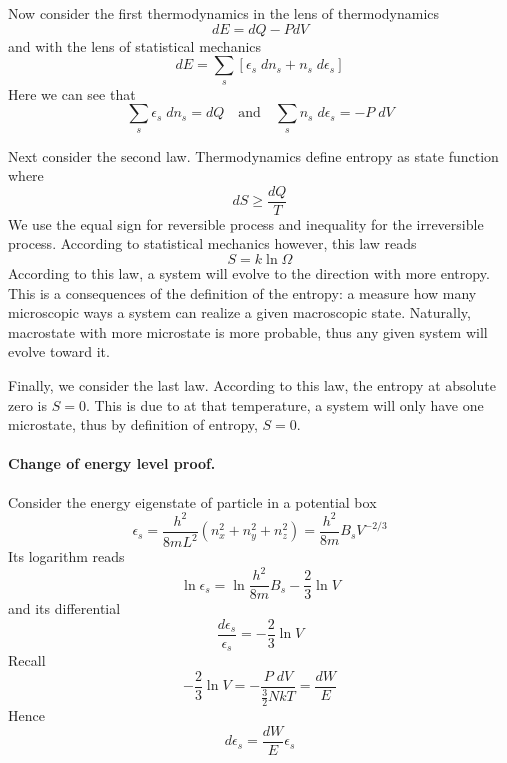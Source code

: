 \documentclass[../../../Main.tex]{subfiles}
\begin{document}
Now consider the first thermodynamics in the lens of thermodynamics
\begin{equation*}
    dE=dQ-PdV
\end{equation*}
and with the lens of statistical mechanics
\begin{equation*}
    dE=\sum_s\left[\epsilon_s\;dn_s+n_s\;d\epsilon_s\right]
\end{equation*}
Here we can see that 
\begin{equation*}
    \sum_s\epsilon_s \;dn_s=dQ \quad\text{and}\quad\sum_s n_s\;d\epsilon_s =-P\;dV
\end{equation*}

Next consider the second law. Thermodynamics define entropy as state function where 
\begin{equation*}
    dS\geq\frac{dQ}{T}
\end{equation*}
We use the equal sign for reversible process and inequality for the irreversible process. According to statistical mechanics however, this law reads 
\begin{equation*}
    S=k\ln\Omega
\end{equation*}
According to this law, a system will evolve to the direction with more entropy. This is a consequences of the definition of the entropy: a measure how many microscopic ways a system can realize a given macroscopic state. Naturally, macrostate with more microstate is more probable, thus any given system will evolve toward it.

Finally, we consider the last law. According to this law, the entropy at absolute zero is $S=0$. This is due to at that temperature, a system will only have one microstate, thus by definition of entropy, $S=0$.

\paragraph{Change of energy level proof.} Consider the energy eigenstate of particle in a potential box
\begin{equation*}
    \epsilon_s=\frac{h^2}{8mL^2}(n_x^2+n_y^2+n_z^2)=\frac{h^2}{8m}B_sV^{-2/3}
\end{equation*}
Its logarithm reads 
\begin{equation*}
    \ln \epsilon_s=\ln\frac{h^2}{8m}B_s -\frac{2}{3}\ln V
\end{equation*}
and its differential
\begin{equation*}
    \frac{d\epsilon_s}{\epsilon_s}=-\frac{2}{3}\ln V
\end{equation*}
Recall 
\begin{equation*}
    -\frac{2}{3}\ln V=-\frac{P\;dV}{\frac{3}{2}NkT}=\frac{dW}{E}
\end{equation*}
Hence 
\begin{equation*}
    d\epsilon_s=\frac{dW}{E}\epsilon_s
\end{equation*}
\end{document}

